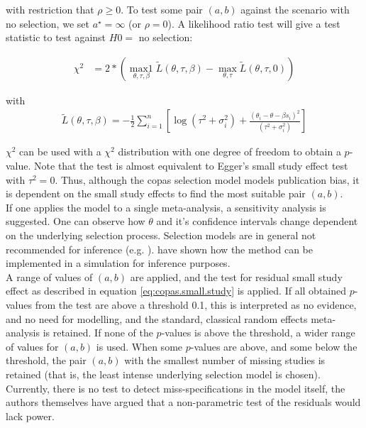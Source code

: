 \documentclass[11pt,a4paper,twoside]{book}\usepackage[]{graphicx}\usepackage[]{color}
\begin{document}
with restriction that $\rho \geq 0$. To test some pair $(a,b)$ against the scenario with no selection, we set $a^\star = \infty$ (or $\rho = 0$). A likelihood ratio test will give a test statistic to test against $H0 =$ no selection:

\begin{align}
\chi^2 &= 2*(\operatorname*{max1}_{\theta, \tau, \beta}\tilde{L}(\theta, \tau, \beta) - \operatorname*{max}_{\theta, \tau}\tilde{L}(\theta, \tau, 0)) \label{eq:copas.small.study}
\end{align}

with 
\begin{align}
\tilde{L}(\theta, \tau, \beta) = -\frac{1}{2}\sum_{i = 1}^n[\log(\tau^2 + \sigma_i^2) + \frac{(\theta_i - \theta - \beta s_i)^2}{(\tau^2 + \sigma_i^2)}] \nonumber
\end{align}

$\chi^2$ can be used with a $\chi^2$ distribution with one degree of freedom to obtain a $p$-value. Note that the test is almost equivalent to Egger's small study effect test with $\tau^2 = 0$. Thus, although the copas selection model models publication bias, it is dependent on the small study effects to find the most suitable pair $(a,b)$. \\
If one applies the model to a single meta-analysis, a sensitivity analysis is suggested. One can observe how $\theta$ and it's confidence intervals change dependent on the underlying selection process. Selection models are in general not recommended for inference (e.g. \citet{selection.assessment}). 
\citet{limitmeta} have shown how the method can be implemented in a simulation for inference purposes. \\
A range of values of $(a,b)$ are applied, and the test for residual small study effect as described in equation \ref{eq:copas.small.study} is applied. If all obtained $p$-values from the test are above a threshold 0.1, this is interpreted as no evidence, and no need for modelling, and the standard, classical random effects meta-analysis is retained. If none of the $p$-values is above the threshold, a wider range of values for $(a,b)$ is used. When some $p$-values are above, and some below the threshold, the pair $(a,b)$ with the smallest number of missing studies is retained (that is, the least intense underlying selection model is chosen).\\
Currently, there is no test to detect miss-specifications in the model itself, the authors themselves have argued that a non-parametric test of the residuals would lack power.
\end{document}
